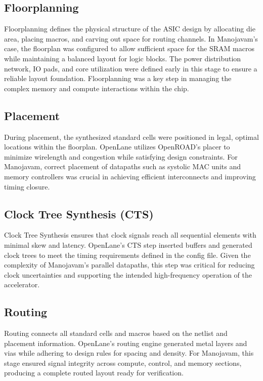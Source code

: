 \subsection{Floorplanning}
Floorplanning defines the physical structure of the ASIC design by allocating die area, placing macros, and carving out space for routing channels. In Manojavam’s case, the floorplan was configured to allow sufficient space for the SRAM macros while maintaining a balanced layout for logic blocks. The power distribution network, IO pads, and core utilization were defined early in this stage to ensure a reliable layout foundation. Floorplanning was a key step in managing the complex memory and compute interactions within the chip.

\subsection{Placement}
During placement, the synthesized standard cells were positioned in legal, optimal locations within the floorplan. OpenLane utilizes OpenROAD’s placer to minimize wirelength and congestion while satisfying design constraints. For Manojavam, correct placement of datapaths such as systolic MAC units and memory controllers was crucial in achieving efficient interconnects and improving timing closure.

\subsection{Clock Tree Synthesis (CTS)}
Clock Tree Synthesis ensures that clock signals reach all sequential elements with minimal skew and latency. OpenLane's CTS step inserted buffers and generated clock trees to meet the timing requirements defined in the config file. Given the complexity of Manojavam’s parallel datapaths, this step was critical for reducing clock uncertainties and supporting the intended high-frequency operation of the accelerator.

\subsection{Routing}
Routing connects all standard cells and macros based on the netlist and placement information. OpenLane’s routing engine generated metal layers and vias while adhering to design rules for spacing and density. For Manojavam, this stage ensured signal integrity across compute, control, and memory sections, producing a complete routed layout ready for verification.

